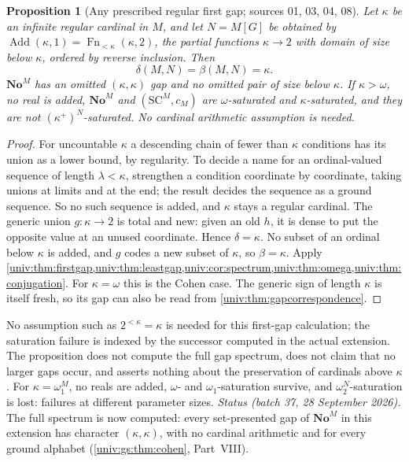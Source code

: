 \documentclass[11pt,letterpaper]{article}
\numberwithin{equation}{section}
\newtheorem{proposition}[proposition]{Proposition}
\theoremstyle{definition}
\theoremstyle{remark}
\newcommand{\No}{\mathbf{No}}
\newcommand{\SC}{\mathrm{SC}}
\newcommand{\NoM}{\No^{M}}
\newcommand{\SCM}{\SC^{M}}
\newcommand{\Add}{\operatorname{Add}}
\begin{document}
\begin{proposition}[Any prescribed regular first gap; sources 01, 03, 04, 08]\label{univ:prop:add}
Let $\kappa$ be an infinite regular cardinal in $M$, and let $N=M[G]$ be
obtained by $\Add(\kappa,1)=\operatorname{Fn}_{<\kappa}(\kappa,2)$, the partial
functions $\kappa\to2$ with domain of size below $\kappa$, ordered by reverse
inclusion. Then
\[
 \delta(M,N)=\beta(M,N)=\kappa.
\]
$\NoM$ has an omitted $(\kappa,\kappa)$ gap and no omitted pair of size below
$\kappa$. If $\kappa>\omega$, no real is added, $\NoM$ and $(\SCM,c_M)$ are
$\omega$-saturated and $\kappa$-saturated, and they are not
$(\kappa^+)^N$-saturated. No cardinal arithmetic assumption is needed.
\end{proposition}
\begin{proof}
For uncountable $\kappa$ a descending chain of fewer than $\kappa$ conditions
has its union as a lower bound, by regularity. To decide a name for an
ordinal-valued sequence of length $\lambda<\kappa$, strengthen a condition
coordinate by coordinate, taking unions at limits and at the end; the result
decides the sequence as a ground sequence. So no such sequence is added, and
$\kappa$ stays a regular cardinal. The generic union $g:\kappa\to2$ is total
and new: given an old $h$, it is dense to put the opposite value at an unused
coordinate. Hence $\delta=\kappa$. No subset of an ordinal below $\kappa$ is
added, and $g$ codes a new subset of $\kappa$, so $\beta=\kappa$. Apply
\cref{univ:thm:firstgap,univ:thm:leastgap,univ:cor:spectrum,univ:thm:omega,univ:thm:conjugation}.
For $\kappa=\omega$ this is the Cohen case. The generic sign of length $\kappa$
is itself fresh, so its gap can also be read from
\cref{univ:thm:gapcorrespondence}.
\end{proof}

No assumption such as $2^{<\kappa}=\kappa$ is needed for this first-gap
calculation; the saturation failure is indexed by the successor computed in
the actual extension. The proposition does not compute the full gap spectrum,
does not claim that no larger gaps occur, and asserts nothing about the
preservation of cardinals above $\kappa$. For $\kappa=\omega_1^M$, no reals
are added, $\omega$- and $\omega_1$-saturation survive, and
$\omega_2^N$-saturation is lost: failures at different parameter sizes.
\emph{Status (batch 37, 28 September 2026).} The full spectrum is now computed:
every set-presented gap of $\NoM$ in this extension has character
$(\kappa,\kappa)$, with no cardinal arithmetic and for every ground alphabet
(\cref{univ:gs:thm:cohen}, Part~VIII).
\end{document}
